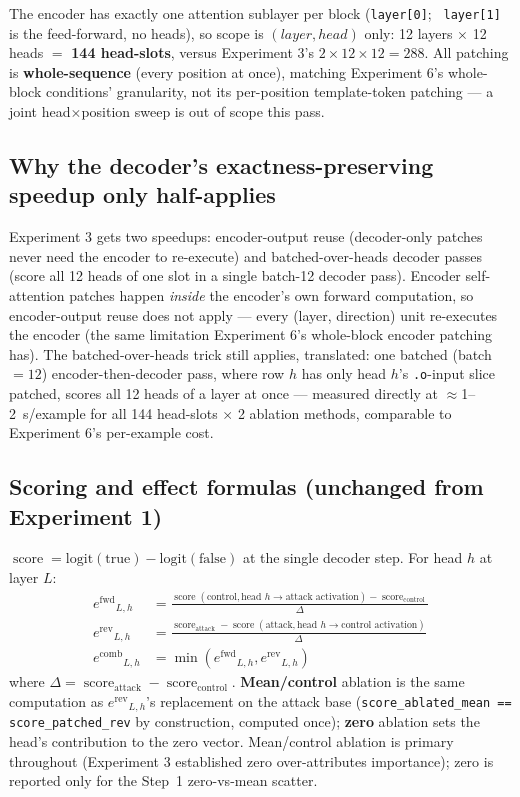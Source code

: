 \documentclass[11pt]{article}
\newcommand{\fwd}{\ensuremath{e^{\mathrm{fwd}}}}
\newcommand{\rev}{\ensuremath{e^{\mathrm{rev}}}}
\newcommand{\score}{\operatorname{score}}
\newcommand{\comb}{\ensuremath{e^{\mathrm{comb}}}}
\begin{document}
The encoder has exactly one attention sublayer per block (\texttt{layer[0]}; \texttt{
layer[1]} is the feed-forward, no heads), so scope is $(layer, head)$ only:
12 layers $\times$ 12 heads $=$ \textbf{144 head-slots}, versus Experiment 3's
$2 \times 12 \times 12 = 288$. All patching is \textbf{whole-sequence} (every position at
once), matching Experiment 6's whole-block conditions' granularity, not its per-position
template-token patching — a joint head$\times$position sweep is out of scope this pass.

\subsection{Why the decoder's exactness-preserving speedup only half-applies}

Experiment 3 gets two speedups: encoder-output reuse (decoder-only patches never need the
encoder to re-execute) and batched-over-heads decoder passes (score all 12 heads of one
slot in a single batch-12 decoder pass). Encoder self-attention patches happen
\emph{inside} the encoder's own forward computation, so encoder-output reuse does not
apply — every (layer, direction) unit re-executes the encoder (the same limitation
Experiment 6's whole-block encoder patching has). The batched-over-heads trick still
applies, translated: one batched (batch$=12$) encoder-then-decoder pass, where row $h$ has
only head $h$'s \texttt{.o}-input slice patched, scores all 12 heads of a layer at once —
measured directly at $\approx$1--2~s/example for all 144 head-slots $\times$ 2 ablation
methods, comparable to Experiment 6's per-example cost.

\subsection{Scoring and effect formulas (unchanged from Experiment 1)}

$\score = \text{logit}(\text{true}) - \text{logit}(\text{false})$ at the single decoder
step. For head $h$ at layer $L$:
\begin{align}
\fwd_{L,h} &= \frac{\score(\text{control}, \text{head } h \to \text{attack activation}) - \score_{\text{control}}}{\Delta} \label{eq:hfwd}\\
\rev_{L,h} &= \frac{\score_{\text{attack}} - \score(\text{attack}, \text{head } h \to \text{control activation})}{\Delta} \label{eq:hrev}\\
\comb_{L,h} &= \min(\fwd_{L,h}, \rev_{L,h}) \label{eq:hcomb}
\end{align}
where $\Delta = \score_{\text{attack}} - \score_{\text{control}}$. \textbf{Mean/control}
ablation is the same computation as $\rev_{L,h}$'s replacement on the attack base
(\texttt{score\_ablated\_mean == score\_patched\_rev} by construction, computed once);
\textbf{zero} ablation sets the head's contribution to the zero vector. Mean/control
ablation is primary throughout (Experiment 3 established zero over-attributes
importance); zero is reported only for the Step~1 zero-vs-mean scatter.
\end{document}
